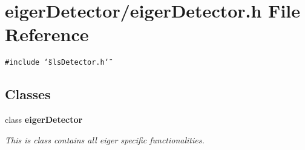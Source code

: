 \section{eiger\-Detector/eiger\-Detector.h File Reference}
\label{eigerDetector_8h}
{\tt \#include \char`\"{}sls\-Detector.h\char`\"{}}\par
\subsection*{Classes}
\begin{CompactItemize}
\item 
class \bf{eiger\-Detector}
\begin{CompactList}\small\item\em This is class contains all eiger specific functionalities. \item\end{CompactList}\end{CompactItemize}

